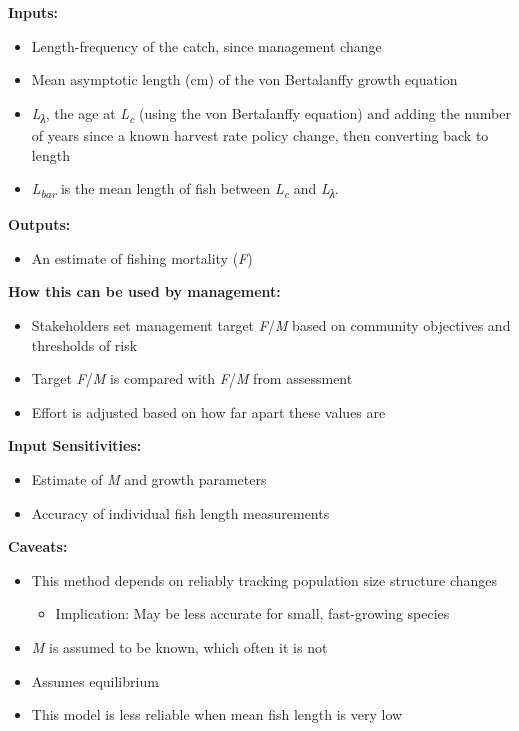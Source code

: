 \documentclass[]{book}
\providecommand{\tightlist}{%
  \setlength{\itemsep}{0pt}\setlength{\parskip}{0pt}}
\begin{document}
\textbf{Inputs:}

\begin{itemize}
\item
  Length-frequency of the catch, since management change
\item
  Mean asymptotic length (cm) of the von Bertalanffy growth equation
\item
  \emph{L\textsubscript{λ}}, the age at \emph{L\textsubscript{c}} (using
  the von Bertalanffy equation) and adding the number of years since a
  known harvest rate policy change, then converting back to length
\item
  \emph{L\textsubscript{bar}} is the mean length of fish between
  \emph{L\textsubscript{c}} and \emph{L\textsubscript{λ}}.
\end{itemize}

\textbf{Outputs:}

\begin{itemize}
\tightlist
\item
  An estimate of fishing mortality (\emph{F})
\end{itemize}

\textbf{How this can be used by management: }

\begin{itemize}
\item
  Stakeholders set management target \emph{F}/\emph{M} based on
  community objectives and thresholds of risk
\item
  Target \emph{F}/\emph{M} is compared with \emph{F}/\emph{M} from
  assessment
\item
  Effort is adjusted based on how far apart these values are
\end{itemize}

\textbf{Input Sensitivities: }

\begin{itemize}
\item
  Estimate of \emph{M} and growth parameters
\item
  Accuracy of individual fish length measurements
\end{itemize}

\textbf{Caveats: }

\begin{itemize}
\item
  This method depends on reliably tracking population size structure
  changes

  \begin{itemize}
  \tightlist
  \item
    Implication: May be less accurate for small, fast-growing species
  \end{itemize}
\item
  \emph{M} is assumed to be known, which often it is not
\item
  Assumes equilibrium
\item
  This model is less reliable when mean fish length is very low
\end{itemize}
\end{document}
